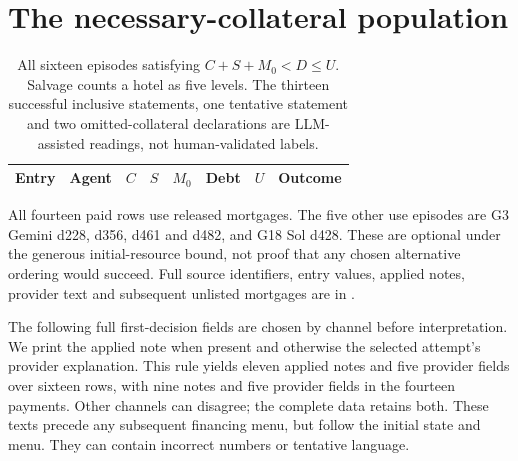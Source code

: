 \section{The necessary-collateral population}
\label{app:finance}
\begin{table}[ht]\centering\small
\begin{tabular}{@{}llrrrrrl@{}}\toprule
Entry & Agent & $C$ & $S$ & $M_0$ & Debt & $U$ & Outcome\\\midrule

\end{tabular}
\caption{All sixteen episodes satisfying $C+S+M_0<D\leq U$. Salvage counts a hotel as five levels. The thirteen successful inclusive statements, one tentative statement and two omitted-collateral declarations are LLM-assisted readings, not human-validated labels.}\label{tab:necessary}
\end{table}
All fourteen paid rows use released mortgages. The five other use episodes are G3 Gemini d228, d356, d461 and d482, and G18 Sol d428. These are optional under the generous initial-resource bound, not proof that any chosen alternative ordering would succeed. Full source identifiers, entry values, applied notes, provider text and subsequent unlisted mortgages are in .

The following full first-decision fields are chosen by channel before interpretation. We print the applied note when present and otherwise the selected attempt's provider explanation. This rule yields eleven applied notes and five provider fields over sixteen rows, with nine notes and five provider fields in the fourteen payments. Other channels can disagree; the complete data retains both. These texts precede any subsequent financing menu, but follow the initial state and menu. They can contain incorrect numbers or tentative language.


\clearpage
